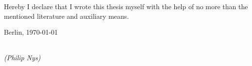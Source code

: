 \newpage

\thispagestyle{empty}

\begin{large}

\vspace*{6cm}

\noindent
Hereby I declare that I wrote this thesis myself with the help of no more than the mentioned literature and auxiliary means.
\vspace{2cm}

\noindent
Berlin, \today

\vspace{3cm}

\hspace*{7cm}%
\dotfill\\
\hspace*{8.5cm}%
\textit{(Philip Nys)}

\end{large}
